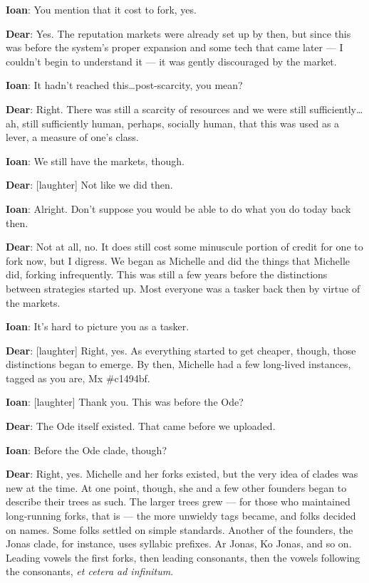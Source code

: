 \textbf{Ioan}: You mention that it cost to fork, yes.

\textbf{Dear}: Yes. The reputation markets were already set up by then, but since this was before the system's proper expansion and some tech that came later — I couldn't begin to understand it — it was gently discouraged by the market.

\textbf{Ioan}: It hadn't reached this\ldots{}post-scarcity, you mean?

\textbf{Dear}: Right. There was still a scarcity of resources and we were still sufficiently\ldots{}ah, still sufficiently human, perhaps, socially human, that this was used as a lever, a measure of one's class.

\textbf{Ioan}: We still have the markets, though.

\textbf{Dear}: {[}laughter{]} Not like we did then.

\textbf{Ioan}: Alright. Don't suppose you would be able to do what you do today back then.

\textbf{Dear}: Not at all, no. It does still cost some minuscule portion of credit for one to fork now, but I digress. We began as Michelle and did the things that Michelle did, forking infrequently. This was still a few years before the distinctions between strategies started up. Most everyone was a tasker back then by virtue of the markets.

\textbf{Ioan}: It's hard to picture you as a tasker.

\textbf{Dear}: {[}laughter{]} Right, yes. As everything started to get cheaper, though, those distinctions began to emerge. By then, Michelle had a few long-lived instances, tagged as you are, Mx \#c1494bf.

\textbf{Ioan}: {[}laughter{]} Thank you. This was before the Ode?

\textbf{Dear}: The Ode itself existed. That came before we uploaded.

\textbf{Ioan}: Before the Ode clade, though?

\textbf{Dear}: Right, yes. Michelle and her forks existed, but the very idea of clades was new at the time. At one point, though, she and a few other founders began to describe their trees as such. The larger trees grew — for those who maintained long-running forks, that is — the more unwieldy tags became, and folks decided on names. Some folks settled on simple standards. Another of the founders, the Jonas clade, for instance, uses syllabic prefixes. Ar Jonas, Ko Jonas, and so on. Leading vowels the first forks, then leading consonants, then the vowels following the consonants, \emph{et cetera ad infinitum}.

